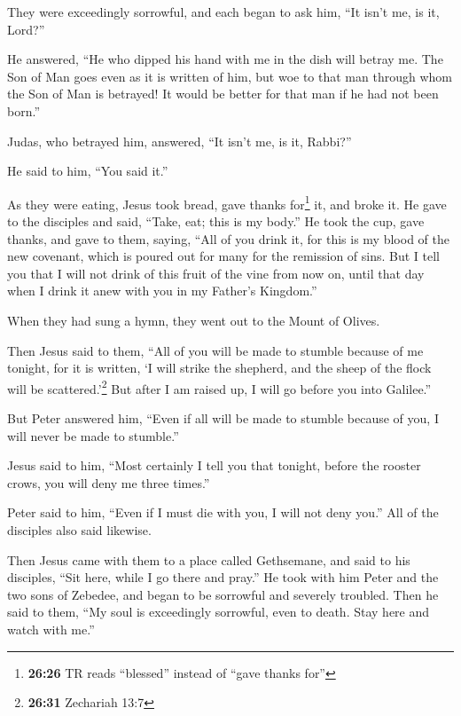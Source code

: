  They were exceedingly sorrowful, and each began to ask
him, ``It isn't me, is it, Lord?''

 He answered, ``He who dipped his hand with me in the
dish will betray me.  The Son of Man goes even as it is
written of him, but woe to that man through whom the Son of Man is
betrayed! It would be better for that man if he had not been born.''

 Judas, who betrayed him, answered, ``It isn't me, is it,
Rabbi?''

He said to him, ``You said it.''

 As they were eating, Jesus took bread, gave thanks
for\footnote{\textbf{26:26} TR reads ``blessed'' instead of ``gave
  thanks for''} it, and broke it. He gave to the disciples and said,
``Take, eat; this is my body.''  He took the cup, gave
thanks, and gave to them, saying, ``All of you drink it, 
for this is my blood of the new covenant, which is poured out for many
for the remission of sins.  But I tell you that I will
not drink of this fruit of the vine from now on, until that day when I
drink it anew with you in my Father's Kingdom.''

 When they had sung a hymn, they went out to the Mount of
Olives.

 Then Jesus said to them, ``All of you will be made to
stumble because of me tonight, for it is written, `I will strike the
shepherd, and the sheep of the flock will be scattered.'\footnote{\textbf{26:31}
  Zechariah 13:7}  But after I am raised up, I will go
before you into Galilee.''

 But Peter answered him, ``Even if all will be made to
stumble because of you, I will never be made to stumble.''

 Jesus said to him, ``Most certainly I tell you that
tonight, before the rooster crows, you will deny me three times.''

 Peter said to him, ``Even if I must die with you, I will
not deny you.'' All of the disciples also said likewise.

 Then Jesus came with them to a place called Gethsemane,
and said to his disciples, ``Sit here, while I go there and pray.''
 He took with him Peter and the two sons of Zebedee, and
began to be sorrowful and severely troubled.  Then he
said to them, ``My soul is exceedingly sorrowful, even to death. Stay
here and watch with me.''

